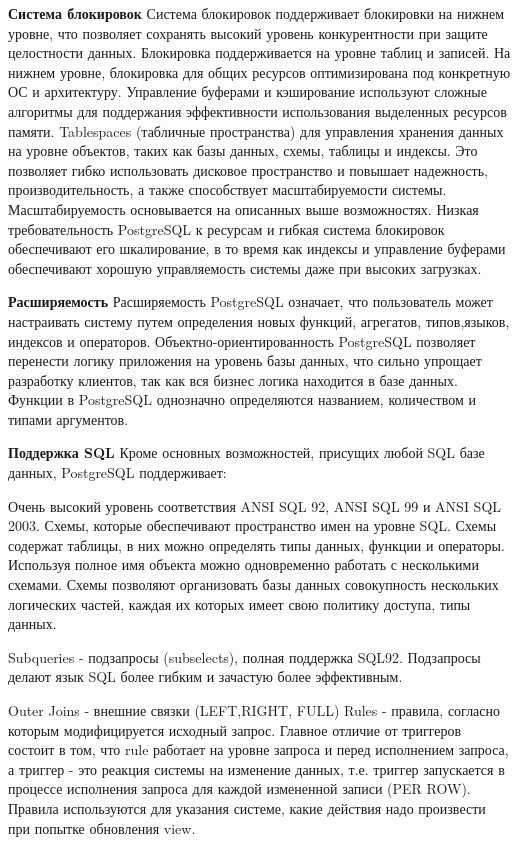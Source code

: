 \textbf{Система блокировок}
Система блокировок поддерживает блокировки на нижнем уровне, что позволяет сохранять высокий уровень конкурентности при защите целостности данных. Блокировка поддерживается на уровне таблиц и записей. На нижнем уровне, блокировка для общих ресурсов оптимизирована под конкретную ОС и архитектуру.
Управление буферами и кэширование используют сложные алгоритмы для поддержания эффективности использования выделенных ресурсов памяти.
Tablespaces (табличные пространства) для управления хранения данных на уровне объектов, таких как базы данных, схемы, таблицы и индексы. Это позволяет гибко использовать дисковое пространство и повышает надежность, производительность, а также способствует масштабируемости системы.
Масштабируемость основывается на описанных выше возможностях. Низкая требовательность PostgreSQL к ресурсам и гибкая система блокировок обеспечивают его шкалирование, в то время как индексы и управление буферами обеспечивают хорошую управляемость системы даже при высоких загрузках.

\textbf{Расширяемость} 
Расширяемость PostgreSQL означает, что пользователь может настраивать систему путем определения новых функций, агрегатов, типов,языков, индексов и операторов. Объектно-ориентированность PostgreSQL позволяет перенести логику приложения на уровень базы данных, что сильно упрощает разработку клиентов, так как вся бизнес логика находится в базе данных. Функции в PostgreSQL однозначно определяются названием, количеством и типами аргументов. 

\textbf{Поддержка SQL} 
Кроме основных возможностей, присущих любой SQL базе данных, PostgreSQL поддерживает:

Очень высокий уровень соответствия ANSI SQL 92, ANSI SQL 99 и ANSI SQL 2003.
Схемы, которые обеспечивают пространство имен на уровне SQL. Схемы содержат таблицы, в них можно определять типы данных, функции и операторы. Используя полное имя объекта можно одновременно работать с несколькими схемами. Схемы позволяют организовать базы данных совокупность нескольких логических частей, каждая их которых имеет свою политику доступа, типы данных.


Subqueries - подзапросы (subselects), полная поддержка SQL92. Подзапросы делают язык SQL более гибким и зачастую более эффективным.


Outer Joins - внешние связки (LEFT,RIGHT, FULL)
Rules - правила, согласно которым модифицируется исходный запрос. Главное отличие от триггеров состоит в том, что rule работает на уровне запроса и перед исполнением запроса, а триггер - это реакция системы на изменение данных, т.е. триггер запускается в процессе исполнения запроса для каждой измененной записи (PER ROW). Правила используются для указания системе, какие действия надо произвести при попытке обновления view.


